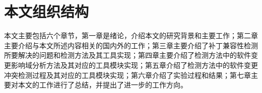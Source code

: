 %
%
%
%
%


\section{本文组织结构}

本文主要包括六个章节，第一章是绪论，介绍本文的研究背景和主要工作；第二章主要介绍与本文所述内容相关的国内外的工作；第三章主要介绍了补丁兼容性检测所要解决的问题和检测方法及其工具实现；第四章主要介绍了检测方法中的软件变更影响域分析方法及其对应的工具模块实现；第五章介绍了检测方法中的软件变更冲突检测过程及其对应的工具模块实现；第六章介绍了实验过程和结果；第七章主要对本文的工作进行了总结，并提出了进一步的工作方向。


